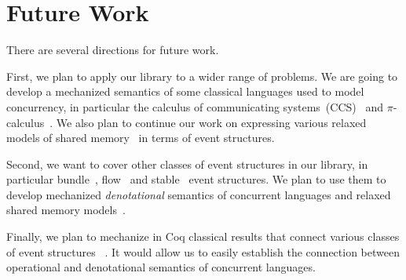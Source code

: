 \section{Future Work}

There are several directions for future work. 

First, we plan to apply our library to a wider range of problems. 
We are going to develop a mechanized semantics of some classical 
languages used to model concurrency, in particular 
the calculus of communicating systems~(CCS)~\cite{Milner:80} and 
$\pi$-calculus~\cite{Milner:99}.      
We also plan to continue our work on 
expressing various relaxed models 
of shared memory~\cite{Lahav-al:POPL16, Lahav-al:PLDI17, Podkopaev-al:POPL19}
in terms of event structures.  

Second, we want to cover other classes of event structures in our library, 
in particular bundle~\cite{Langerak:91}, flow~\cite{Boudol-Castellani:1991}
and stable~\cite{Winskel:82, Winskel:86} event structures.
We plan to use them to develop mechanized \emph{denotational} semantics 
of concurrent languages and relaxed shared memory models~\cite{Dodds-al:ESOP18}.  

Finally, we plan to mechanize in Coq classical results 
that connect various classes of event structures%
~\cite{Nielsen-al:1981, Boudol-Castellani:1991}. 
It would allow us to easily establish the connection between operational and denotational 
semantics of concurrent languages.
